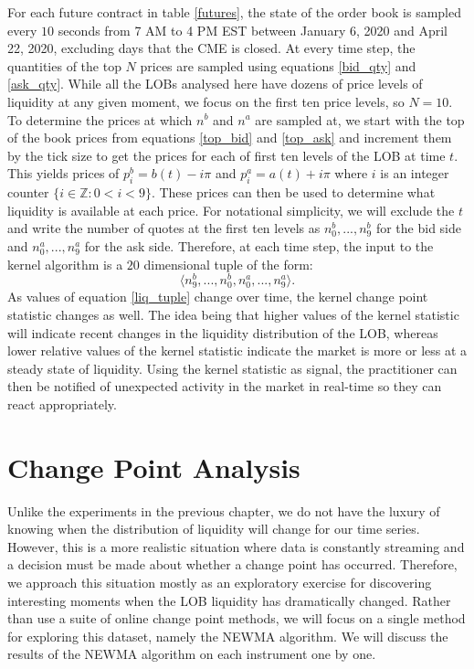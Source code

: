 For each future contract in table \ref{futures}, the state of the order book is sampled every $10$ seconds from 7 AM to 4 PM EST between January 6, 2020 and April 22, 2020, excluding days that the CME is closed. At every time step, the quantities of the top $N$ prices are sampled using equations \ref{bid_qty} and \ref{ask_qty}. While all the LOBs analysed here have dozens of price levels of liquidity at any given moment, we focus on the first ten price levels, so $N=10$. To determine the prices at which $n^b$ and $n^a$ are sampled at, we start with the top of the book prices from equations \ref{top_bid} and \ref{top_ask} and   increment them by the tick size to get the prices for each of first ten levels of the LOB at time $t$. This yields prices of $p_i^b=b(t) - i\pi$  and $p_i^a=a(t) + i\pi$ where $i$ is an integer counter $\{i \in  \mathbb{Z}: 0<i<9\}$. These prices can then be used to determine what liquidity is available at each price.  For notational simplicity, we will exclude the $t$ and write the number of quotes at the first ten levels as $n_0^b,...,n_9^b$ for the bid side and  $n_0^a,...,n_9^a$ for the ask side. Therefore, at each time step, the input to the kernel algorithm is a $20$ dimensional tuple of the form:
\begin{equation}
\label{liq_tuple}
\langle n_9^b,...,n_0^b, n_0^a,...,n_9^a \rangle.
\end{equation}
As values of equation \ref{liq_tuple} change over time, the kernel change point statistic changes as well. The idea being that higher values of the kernel statistic will indicate recent changes in the liquidity distribution of the LOB, whereas lower relative values of the kernel statistic indicate the market is more or less at a steady state of liquidity. Using the kernel statistic as signal, the practitioner can then be notified of unexpected activity in the market in real-time so they can react appropriately. %

\section{Change Point Analysis}
\label{cp_analysis}
Unlike the experiments in the previous chapter, we do not have the luxury of knowing when the distribution of liquidity will change for our time series. However, this is a more realistic situation where data is constantly streaming and a decision must be made about whether a change point has occurred. Therefore, we approach this situation mostly as an exploratory exercise for discovering interesting moments when the LOB liquidity has dramatically changed. Rather than use a suite of online change point methods, we will focus on a single method for exploring this dataset, namely the NEWMA algorithm. We will discuss the results of the NEWMA algorithm on each instrument one by one. 

